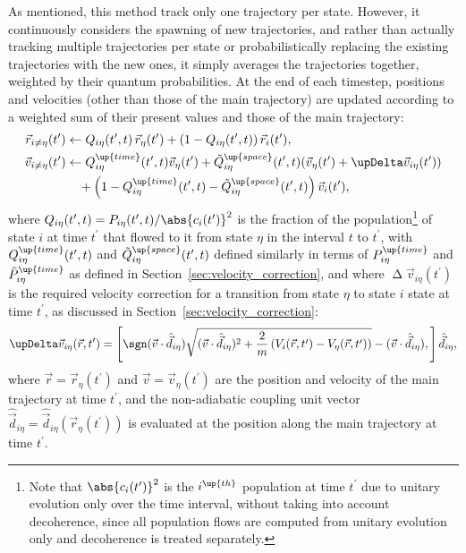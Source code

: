 As mentioned, this method track only one trajectory per state. However, it continuously considers the spawning of new trajectories, and rather than actually tracking multiple trajectories per state or probabilistically replacing the existing trajectories with the new ones, it simply averages the trajectories together, weighted by their quantum probabilities. At the end of each timestep, positions and velocities (other than those of the main trajectory) are updated according to a weighted sum of their present values and those of the main trajectory:
\begin{align}\label{eq:position_averaging}
\vec r_{i\neq\eta}(t^\prime) &\leftarrow 
  Q_{i\eta}(t^\prime, t)\,\vec r_\eta(t^\prime)
  + \left(1 - Q_{i\eta}(t^\prime, t)\right)\vec r_i(t^\prime),\\
\vec v_{i\neq\eta}(t^\prime) &\leftarrow
  Q^\up{time}_{i\eta}(t^\prime, t)\vec v_\eta(t^\prime)
  + \tilde Q^\up{space}_{i\eta}(t^\prime, t)(\vec v_\eta(t^\prime) + \upDelta \vec v_{i\eta}(t^\prime))\nonumber\\
  &\phantom{\rightarrow} + \left(1 - Q^\up{time}_{i\eta}(t^\prime, t) - \tilde Q^\up{space}_{i\eta}(t^\prime, t)\right)\vec v_i(t^\prime),
  \label{eq:velocity_averaging}
\end{align}
where $Q_{i\eta}(t^\prime, t) = P_{i\eta}(t^\prime, t)/\abs{c_i(t^\prime)}^2$ is the fraction of the population\footnote{Note that $\abs{c_i(t^\prime)}^2$ is the $i^\up{th}$ population at time $t^\prime$ due to unitary evolution only over the time interval, without taking into account decoherence, since all population flows are computed from unitary evolution only and decoherence is treated separately.} of state $i$ at time $t^\prime$ that flowed to it from state $\eta$ in the interval $t$ to $t^\prime$, with $Q_{i\eta}^\up{time}(t^\prime, t)$ and $\tilde Q_{i\eta}^\up{space}(t^\prime, t)$ defined similarly in terms of $P_{i\eta}^\up{time}$ and $\tilde P_{i\eta}^\up{time}$ as defined in Section~\ref{sec:velocity_correction}, and where $\upDelta \vec v_{i\eta}(t^\prime)$ is the required velocity correction for a transition from state $\eta$ to state $i$ state at time $t^\prime$, as discussed in Section~\ref{sec:velocity_correction}:
\begin{align}\label{eq:non_markovian_velocity_jump}
\upDelta \vec v_{i\eta}(\vec r, t^\prime) = \left[\sgn(\vec v\cdot \hat{\vec d}_{i\eta})
\sqrt{(\vec v\cdot \hat{\vec d}_{i\eta})^2 + \frac2m\left(V_i(\vec r, t^\prime) - V_\eta(\vec r, t^\prime)\right)} - (\vec v\cdot \hat{\vec d}_{i\eta}),
\right]\hat{\vec d}_{i\eta},
\end{align}
where $\vec r = \vec r_\eta(t^\prime)$ and $\vec v = \vec v_\eta(t^\prime)$ are the position and velocity of the main trajectory at time $t^\prime$, and the non-adiabatic coupling unit vector $\hat{\vec d}_{i\eta} = \hat{\vec d}_{i\eta}(\vec r_\eta(t^\prime))$ is evaluated at the position along the main trajectory at time $t^\prime$.

